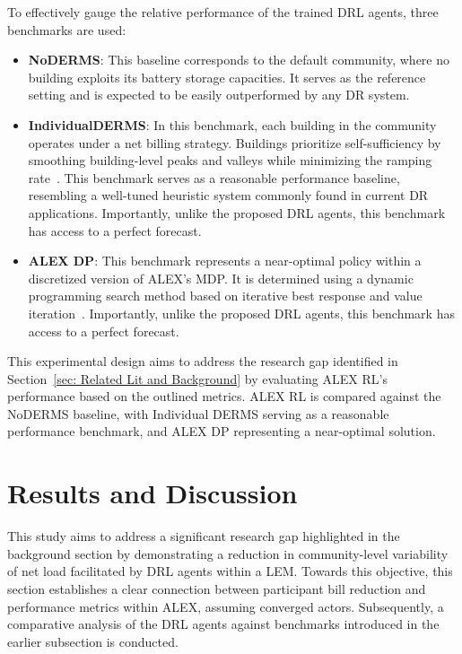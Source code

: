 \documentclass[preprint, 12pt]{elsarticle}
\begin{document}
To effectively gauge the relative performance of the trained DRL agents, three benchmarks are used:
\begin{itemize}
    \item \textbf{NoDERMS}:
    This baseline corresponds to the default community, where no building exploits its battery storage capacities. It serves as the reference setting and is expected to be easily outperformed by any DR system. 
    \item \textbf{IndividualDERMS}: 
    In this benchmark, each building in the community operates under a net billing strategy. Buildings prioritize self-sufficiency by smoothing building-level peaks and valleys while minimizing the ramping rate~\cite{ALEXV2}. This benchmark serves as a reasonable performance baseline, resembling a well-tuned heuristic system commonly found in current DR applications. Importantly, unlike the proposed DRL agents, this benchmark has access to a perfect forecast.
    \item \textbf{ALEX DP}:
    This benchmark represents a near-optimal policy within a discretized version of ALEX's MDP. It is determined using a dynamic programming search method based on iterative best response and value iteration~\cite{ALEXV2}. Importantly, unlike the proposed DRL agents, this benchmark has access to a perfect forecast.   
\end{itemize}

This experimental design aims to address the research gap identified in Section~\ref{sec: Related Lit and Background} by evaluating ALEX RL's performance based on the outlined metrics. ALEX RL is compared against the NoDERMS baseline, with Individual DERMS serving as a reasonable performance benchmark, and ALEX DP representing a near-optimal solution.

\section{Results and Discussion}\label{sec: Discussion}

This study aims to address a significant research gap highlighted in the background section by demonstrating a reduction in community-level variability of net load facilitated by DRL agents within a LEM.
Towards this objective, this section establishes a clear connection between participant bill reduction and performance metrics within ALEX, assuming converged actors.
Subsequently, a comparative analysis of the DRL agents against benchmarks introduced in the earlier subsection is conducted.
\end{document}
